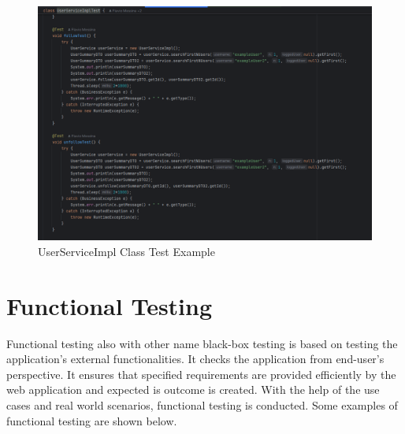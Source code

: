 \begin{figure}[h]
    \centering
    \includegraphics[width=\linewidth]{Media/test_example_2.png}
    \caption{UserServiceImpl Class Test Example}
    \label{UserServiceImpl Class Test Example}
\end{figure}

\newpage

\section{Functional Testing}
Functional testing also with other name black-box testing is based on testing the application's external functionalities. It checks the application from end-user's 
perspective. It ensures that specified requirements are provided efficiently by the web application and expected is outcome is created. 
With the help of the use cases and real world scenarios, functional testing is conducted. Some examples of functional testing are shown below.

